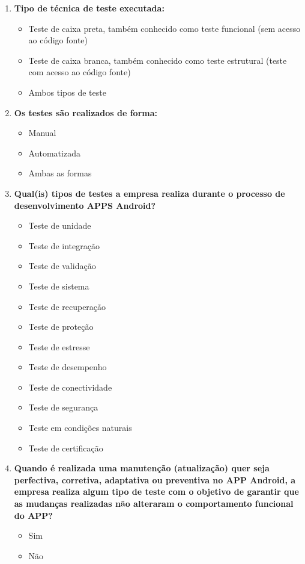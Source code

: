 \begin{enumerate}[label=\bf A\arabic*,leftmargin=1.8cm]
\begin{enumerate}[label= \arabic*]
     \item \textbf{Tipo de técnica de teste executada:}
     \begin{itemize}
         \item Teste de caixa preta, também conhecido como teste funcional (sem acesso ao código fonte)
         \item Teste de caixa branca, também conhecido como teste estrutural (teste com acesso ao código fonte)
         \item Ambos tipos de teste
     \end{itemize}
     
    \item \textbf{Os testes são realizados de forma:}
     \begin{itemize}
        \item Manual
        \item Automatizada
        \item Ambas as formas
     \end{itemize}
    
    \item \textbf{Qual(is) tipos de testes a empresa realiza durante o processo de desenvolvimento \ac{APPS} Android?}
    \begin{itemize}
        \item Teste de unidade
        \item Teste de integração
        \item Teste de validação
        \item Teste de sistema
        \item Teste de recuperação
        \item Teste de proteção
        \item Teste de estresse
        \item Teste de desempenho
        \item Teste de conectividade
        \item Teste de segurança
        \item Teste em condições naturais
        \item Teste de certificação
    \end{itemize}
     
     \item \textbf{Quando é realizada uma manutenção (atualização) quer seja perfectiva, corretiva, adaptativa ou preventiva no APP Android, a empresa realiza algum tipo de teste com o objetivo de garantir que as mudanças realizadas não alteraram o comportamento funcional do APP?}
     \begin{itemize}
         \item Sim
         \item Não
     \end{itemize}
     

\end{enumerate}
\end{enumerate}

